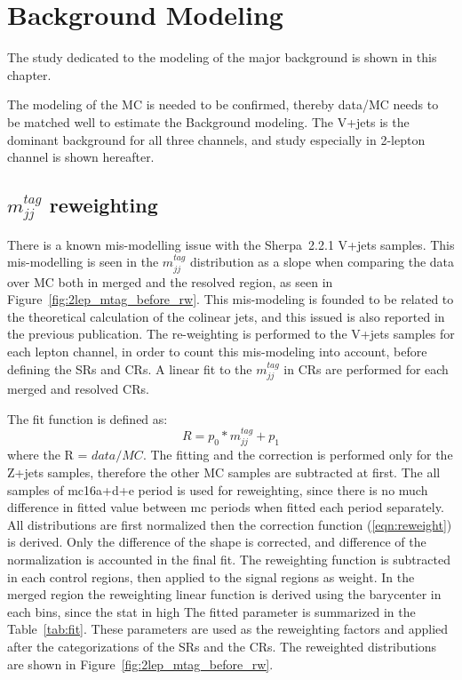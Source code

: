 \chapter{Background Modeling}
\label{chap:modeling}
The study dedicated to the modeling of the major background is shown in this chapter. 

The modeling of the MC is needed to be confirmed, thereby data/MC needs to be matched well to estimate the Background modeling.
The V+jets is the dominant background for all three channels, and study especially in 2-lepton channel is shown hereafter. 

\section{$m_{jj}^{tag}$ reweighting}
There is a known mis-modelling issue with the Sherpa~2.2.1 V+jets samples. This mis-modelling is seen in the $m^{tag}_{jj}$ distribution as a slope when comparing the data over MC both in merged and the resolved region, as seen in Figure~\ref{fig:2lep_mtag_before_rw}. 
This mis-modeling is founded to be related to the theoretical calculation of the colinear jets, and this issued is also reported in the previous publication\cite{ref:}. 
The re-weighting is performed to the V+jets samples for each lepton channel, in order to count this mis-modeling into account, before defining the SRs and CRs. A linear fit to the $m^{tag}_{jj}$ in CRs are performed for each merged and resolved CRs. 

The fit function is defined as:
\begin{equation}
\label{eqn:reweight}
R=p_{0} * m_{jj}^{tag}+p_{1}
\end{equation}
where the R = $data/MC$. The fitting and the  correction is performed only for the Z+jets samples, therefore the other MC samples are subtracted at first. The all samples of mc16a+d+e period is used for reweighting, since there is no much difference in fitted value between mc periods when fitted each period separately. All distributions are first normalized then the correction function (\ref{eqn:reweight}) is derived. Only the difference of the shape is corrected, and difference of the normalization is accounted in the final fit.
The reweighting function is subtracted in each control regions, then applied to the signal regions as weight.
In the merged region the reweighting linear function is derived using the barycenter in each bins, since the stat in high 
The fitted parameter is summarized in the Table~\ref{tab:fit}. These parameters are used as the reweighting factors and applied after the categorizations of the SRs and the CRs. The reweighted distributions are shown in Figure~\ref{fig:2lep_mtag_before_rw}.


